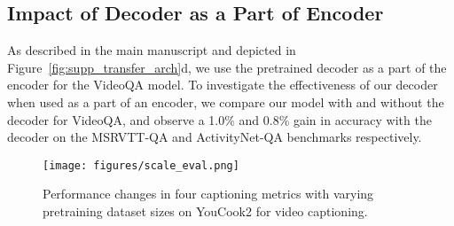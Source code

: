 \documentclass[10pt,twocolumn,letterpaper]{article}
\begin{document}
\subsection{Impact of Decoder as a Part of Encoder}
As described in the main manuscript and depicted in Figure~\ref{fig:supp_transfer_arch}d, we use the pretrained decoder as a part of the encoder for the VideoQA model. 
To investigate the effectiveness of our decoder when used as a part of an encoder,
we compare our model with and without the decoder for VideoQA, and observe a 1.0\% and 0.8\% gain in accuracy with the decoder on the MSRVTT-QA and ActivityNet-QA benchmarks respectively.

\begin{figure}
    \centering
    \texttt{[image: figures/scale\_eval.png]}
    \caption{Performance changes in four captioning metrics with varying pretraining dataset sizes on YouCook2 for video captioning. }
    \label{fig:scale}
\end{figure}

\begin{table}[t]
    \centering
    \caption{
    Comparisons to existing pretraining losses on MSR-VTT. 
    } 
    \label{tab:comps-loss-supp}

\end{table}
\end{document}
